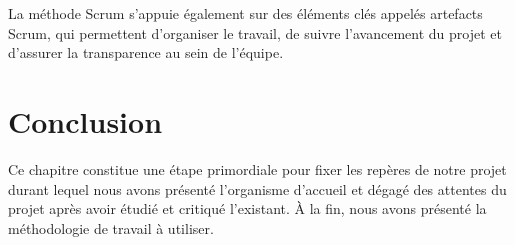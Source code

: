 La méthode Scrum s’appuie également sur des éléments clés appelés artefacts Scrum, qui permettent d’organiser le travail, de suivre l’avancement du projet et d’assurer la transparence au sein de l’équipe.

 
\section{Conclusion}

Ce chapitre constitue une étape primordiale pour fixer les repères de notre projet durant lequel nous avons présenté l’organisme d’accueil et dégagé des attentes du projet après avoir étudié et critiqué l’existant. À la fin, nous avons présenté la méthodologie de travail à utiliser.
